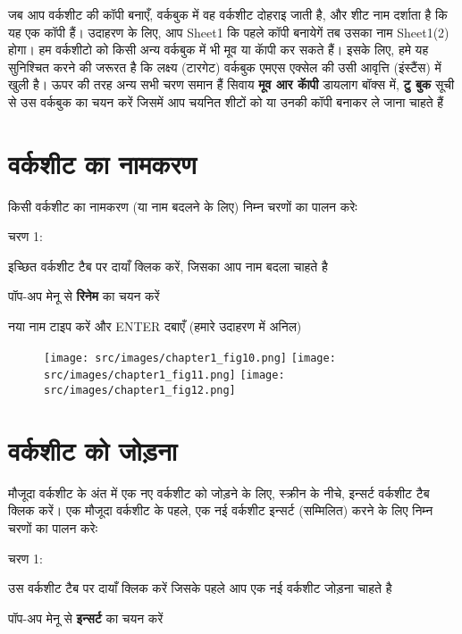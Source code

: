 जब आप वर्कशीट की कॉपी बनाएँ, वर्कबुक में वह वर्कशीट दोहराइ जाती है, और शीट नाम दर्शाता है कि यह एक कॉपी हैं। उदाहरण के लिए, आप  {\rm Sheet1}  कि पहले कॉपी बनायेगें तब उसका नाम  {\rm Sheet1(2)}  होगा। हम वर्कशीटो को किसी अन्य वर्कबुक में भी मूव या कॅापी कर सकते हैं। इसके लिए, हमे यह सुनिश्चित करने की जरूरत है कि लक्ष्य (टारगेट) वर्कबुक एमएस एक्सेल की उसी आवृत्ति (इंस्टैंस) में खुली है। ऊपर की तरह अन्य सभी चरण समान हैं सिवाय \textbf{मूव आर कॅापी} डायलाग बॉक्स में, \textbf{टु बुक} सूची से उस वर्कबुक का चयन करें जिसमें आप चयनित शीटों को या उनकी कॉपी बनाकर ले जाना चाहते हैं

\section{वर्कशीट का नामकरण}\label{id-1.8}

किसी वर्कशीट का नामकरण (या नाम बदलने के लिए) निम्न चरणों का पालन करेः
\begin{descriptionSimple}{चरण 1:}
\item[चरण 1] इच्छित वर्कशीट टैब पर दायाँ क्लिक करें, जिसका आप नाम बदला चाहते है
\item[चरण 2] पॉप-अप मेनू से \textbf{रिनेम} का चयन करें
\item[चरण 3] नया नाम टाइप करें और  {\rm ENTER}  दबाएँ (हमारे उदाहरण में अनिल)
\end{descriptionSimple}

\begin{figure}[H]
\centering
\texttt{[image: src/images/chapter1\_fig10.png]}
\texttt{[image: src/images/chapter1\_fig11.png]}
\texttt{[image: src/images/chapter1\_fig12.png]}
\end{figure}

\section{वर्कशीट को जोड़ना}\label{id-1.9}

मौजूदा वर्कशीट के अंत में एक नए वर्कशीट को जोड़ने के लिए, स्क्रीन के नीचे, इन्सर्ट वर्कशीट टैब क्लिक करें। एक मौजूदा वर्कशीट के पहले, एक नई वर्कशीट इन्सर्ट (सम्मिलित) करने के लिए निम्न चरणों का पालन करेः
\begin{descriptionSimple}{चरण 1:}
\item[चरण 1] उस वर्कशीट टैब पर दायाँ क्लिक करें जिसके पहले आप एक नई वर्कशीट जोड़ना चाहते है
\item[चरण 2] पॉप-अप मेनू से \textbf{इन्सर्ट} का चयन करें
\end{descriptionSimple}		

